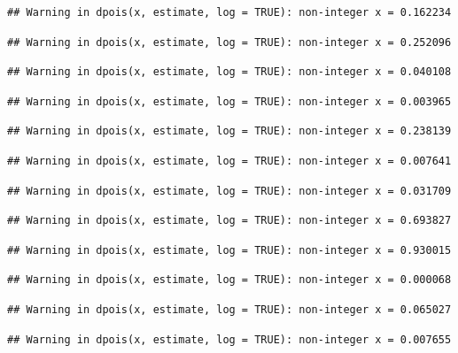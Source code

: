 \documentclass[]{article}
\begin{document}
\begin{verbatim}
## Warning in dpois(x, estimate, log = TRUE): non-integer x = 0.162234
\end{verbatim}

\begin{verbatim}
## Warning in dpois(x, estimate, log = TRUE): non-integer x = 0.252096
\end{verbatim}

\begin{verbatim}
## Warning in dpois(x, estimate, log = TRUE): non-integer x = 0.040108
\end{verbatim}

\begin{verbatim}
## Warning in dpois(x, estimate, log = TRUE): non-integer x = 0.003965
\end{verbatim}

\begin{verbatim}
## Warning in dpois(x, estimate, log = TRUE): non-integer x = 0.238139
\end{verbatim}

\begin{verbatim}
## Warning in dpois(x, estimate, log = TRUE): non-integer x = 0.007641
\end{verbatim}

\begin{verbatim}
## Warning in dpois(x, estimate, log = TRUE): non-integer x = 0.031709
\end{verbatim}

\begin{verbatim}
## Warning in dpois(x, estimate, log = TRUE): non-integer x = 0.693827
\end{verbatim}

\begin{verbatim}
## Warning in dpois(x, estimate, log = TRUE): non-integer x = 0.930015
\end{verbatim}

\begin{verbatim}
## Warning in dpois(x, estimate, log = TRUE): non-integer x = 0.000068
\end{verbatim}

\begin{verbatim}
## Warning in dpois(x, estimate, log = TRUE): non-integer x = 0.065027
\end{verbatim}

\begin{verbatim}
## Warning in dpois(x, estimate, log = TRUE): non-integer x = 0.007655
\end{verbatim}
\end{document}
